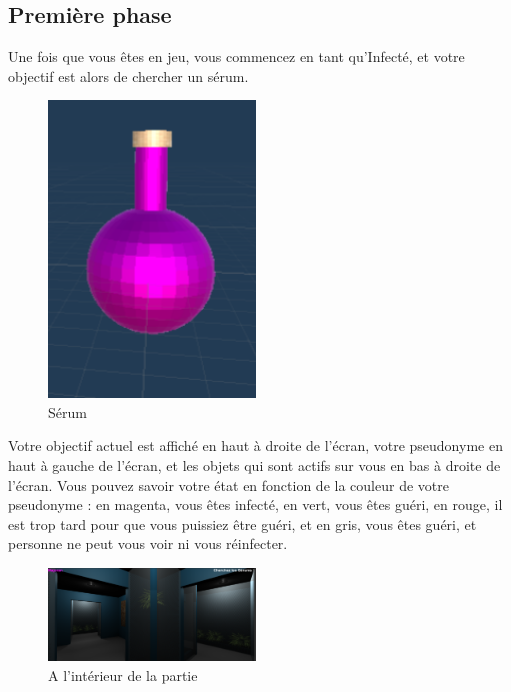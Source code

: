 \documentclass{article}
\begin{document}
\subsection{Première phase}

Une fois que vous êtes en jeu, vous commencez en tant qu'Infecté, et votre objectif est alors de chercher un sérum.

\begin{figure}[H]
	\centering
	\includegraphics[width=0.49\textwidth]{Fioles.png}
	\caption{Sérum}
	\label{Sérum}
\end{figure}

Votre objectif actuel est affiché en haut à droite de l'écran, votre pseudonyme en haut à gauche de l'écran, et les objets qui sont actifs sur vous en bas à droite de l'écran. Vous pouvez savoir votre état en fonction de la couleur de votre pseudonyme : en magenta, vous êtes infecté, en vert, vous êtes guéri, en rouge, il est trop tard pour que vous puissiez être guéri, et en gris, vous êtes guéri, et personne ne peut vous voir ni vous réinfecter.

\begin{figure}[H]
	\centering
	\includegraphics[width=0.49\textwidth]{Lumieres.png}
	\caption{A l'intérieur de la partie}
	\label{A l'intérieur de la partie}
\end{figure}
\end{document}
